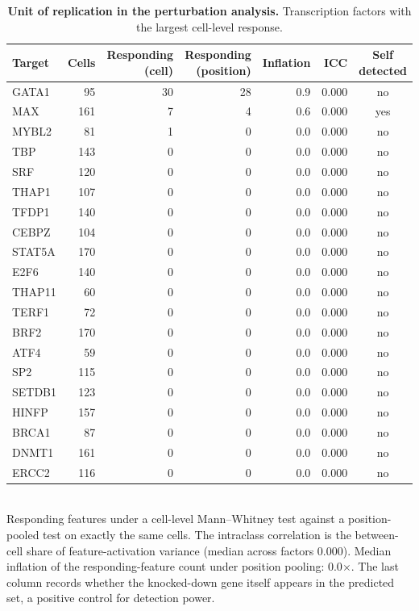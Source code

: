 \documentclass[11pt]{article}
\begin{document}
\begin{table}[htbp]
\centering
\caption{\textbf{Unit of replication in the perturbation analysis.} Transcription factors with the largest cell-level response.}
\label{tab:cell_level}
\smallskip
\small
\begin{tabular}{lrrrrrc}
\toprule
Target & Cells & Responding (cell) & Responding (position) & Inflation & ICC & Self detected \\
\midrule
GATA1 & 95 & 30 & 28 & 0.9 & 0.000 & no \\
MAX & 161 & 7 & 4 & 0.6 & 0.000 & yes \\
MYBL2 & 81 & 1 & 0 & 0.0 & 0.000 & no \\
TBP & 143 & 0 & 0 & 0.0 & 0.000 & no \\
SRF & 120 & 0 & 0 & 0.0 & 0.000 & no \\
THAP1 & 107 & 0 & 0 & 0.0 & 0.000 & no \\
TFDP1 & 140 & 0 & 0 & 0.0 & 0.000 & no \\
CEBPZ & 104 & 0 & 0 & 0.0 & 0.000 & no \\
STAT5A & 170 & 0 & 0 & 0.0 & 0.000 & no \\
E2F6 & 140 & 0 & 0 & 0.0 & 0.000 & no \\
THAP11 & 60 & 0 & 0 & 0.0 & 0.000 & no \\
TERF1 & 72 & 0 & 0 & 0.0 & 0.000 & no \\
BRF2 & 170 & 0 & 0 & 0.0 & 0.000 & no \\
ATF4 & 59 & 0 & 0 & 0.0 & 0.000 & no \\
SP2 & 115 & 0 & 0 & 0.0 & 0.000 & no \\
SETDB1 & 123 & 0 & 0 & 0.0 & 0.000 & no \\
HINFP & 157 & 0 & 0 & 0.0 & 0.000 & no \\
BRCA1 & 87 & 0 & 0 & 0.0 & 0.000 & no \\
DNMT1 & 161 & 0 & 0 & 0.0 & 0.000 & no \\
ERCC2 & 116 & 0 & 0 & 0.0 & 0.000 & no \\
\bottomrule
\end{tabular}
\\[2pt]
\footnotesize Responding features under a cell-level Mann--Whitney test against a position-pooled test on exactly the same cells. The intraclass correlation is the between-cell share of feature-activation variance (median across factors 0.000). Median inflation of the responding-feature count under position pooling: 0.0$\times$. The last column records whether the knocked-down gene itself appears in the predicted set, a positive control for detection power.
\end{table}
\end{document}
